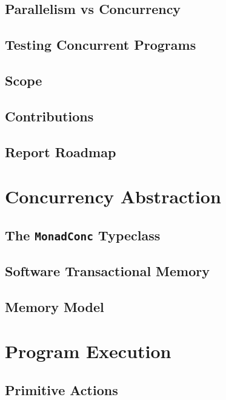 \documentclass[openright, dottedtoc, headinclude, footinclude=true, a4paper, numbers=noenddot, fontsize=10pt]{scrreprt}
\newcommand{\Section}[2]{\section{#2}%
\label{chap:#1}%
}
\begin{document}
  \subsection{Parallelism vs Concurrency}
  \label{sec:introduction-parconc}
  

  \subsection{Testing Concurrent Programs}
  \label{sec:introduction-testing}
  

  \subsection{Scope}
  \label{sec:introduction-scope}
  

  \subsection{Contributions}
  \label{sec:introduction-contribs}
  

  \subsection{Report Roadmap}
  \label{sec:introduction-roadmap}
  

\Section{abstraction}{Concurrency Abstraction}
  \subsection{The \texttt{MonadConc} Typeclass}
  \label{sec:abstraction-typeclass}
  

  \subsection{Software Transactional Memory}
  \label{sec:abstraction-stm}
  

  \subsection{Memory Model}
  \label{sec:abstraction-mem}
  

\Section{execution}{Program Execution}
  \subsection{Primitive Actions}
  \label{sec:execution-primops}
  
\end{document}
